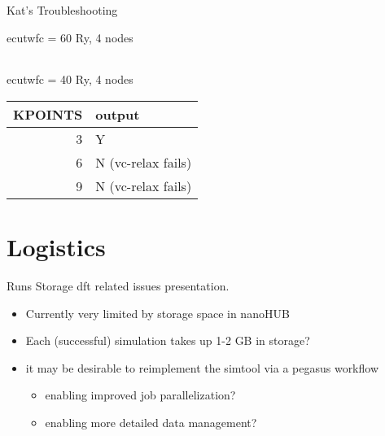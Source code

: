 \documentclass[8pt, compress]{beamer}
\begin{document}
\begin{frame}[allowframebreaks]{Kat's Troubleshooting}
\begin{block}{ecutwfc = 60 Ry, 4 nodes}
\begin{center}
\begin{tabular}{rl}
\end{tabular}
\end{center}
\end{block}
\begin{block}{ecutwfc = 40 Ry, 4 nodes}
\begin{center}
\begin{tabular}{rl}
KPOINTS & output\\
\hline
3 & Y\\
6 & N (vc-relax fails)\\
9 & N (vc-relax fails)\\
\end{tabular}
\end{center}
\end{block}
\end{frame}
\section{Logistics}
\label{sec:org2b00c41}
\begin{frame}[label={sec:org44d2fef}]{Runs Storage}
dft related issues presentation.

\begin{itemize}
\item Currently very limited by storage space in nanoHUB
\item Each (successful) simulation takes up 1-2 GB in storage?
\item it may be desirable to reimplement the simtool via a pegasus workflow
\begin{itemize}
\item enabling improved job parallelization?
\item enabling more detailed data management?
\end{itemize}
\end{itemize}
\end{frame}
\end{document}
